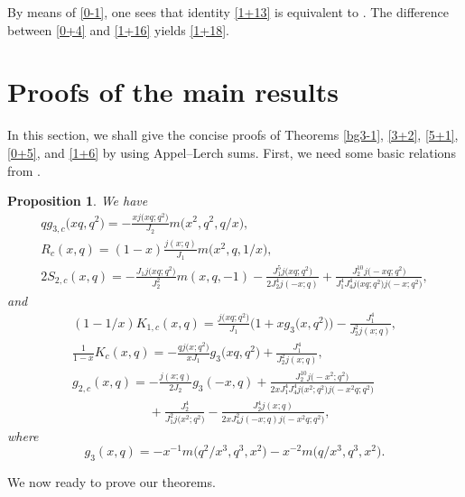 \documentclass[10pt,a4paper]{amsart}
\numberwithin{equation}{section}
\newtheorem{Proposition}[Theorem]{Proposition}
 { \theoremstyle{definition}
\newtheorem{Definition}[Theorem]{Definition}
\newtheorem{Note}[Theorem]{Note}
\newtheorem{Example}[Theorem]{Example}
\newtheorem{Remark}[Theorem]{Remark} }
\begin{document}
\begin{Remark}
By means of \eqref{0-1}, one sees that identity \eqref{1+13} is equivalent to \cite[equation~(16)]{Hi}.
The difference between \eqref{0+4} and \eqref{1+16} yields \eqref{1+18}.
\end{Remark}

\section{Proofs of the main results} \label{sec1}
In this section, we shall give the concise proofs of Theorems \ref{bg3-1}, \ref{3+2}, \ref{5+1}, \ref{0+5}, and \ref{1+6} by using Appel--Lerch sums. First, we need some basic relations from \cite[equations~(4.1), (3.1), (5.12), (5.5), (5.18), (6.10)]{Mo}.
\begin{Proposition} We have
\begin{gather}
\label{2-5}
qg_{3,c}\bigl(xq,q^2\bigr)=-\frac{xj\bigl(xq;q^2\bigr)}{J_2}m\bigl(x^2,q^2,q/x\bigr),\\
R_c(x,q)=(1-x)\frac{j(x;q)}{J_1}m\bigl(x^2,q,1/x\bigr),\label{2.2-add}\\
2S_{2,c}(x,q)=-\frac{J_1j\bigl(xq;q^2\bigr)}{J_2^2}m(x,q,-1)
-\frac{J_1^5j\bigl(xq;q^2\bigr)}{2J_2^4j(-x;q)}+\frac{J_2^{10}j\bigl(-xq;q^2\bigr)}{J_1^4J_4^4j \bigl(xq;q^2\bigr)j\bigl(-x;q^2\bigr)}, \label{3-3}
\end{gather}
and
\begin{gather}\label{2-7}
(1-1/x)K_{1,c}(x,q)=\frac{j\bigl(xq;q^2\bigr)}{J_1}\bigl(1+xg_3\bigl(x,q^2\bigr)\bigr)
-\frac{J_1^4}{J_2^2j(x;q)},\\
\frac{1}{1-x}K_{c}(x,q)=-\frac{qj\bigl(x;q^2\bigr)}{xJ_1}g_3\bigl(xq,q^2\bigr)
+\frac{J_1^4}{J_2^2j(x;q)},\label{2-4}\\
g_{2,c}(x,q)=-\frac{j(x;q)}{2J_2}g_3(-x,q)
+\frac{J_2^{10}j\bigl(-x^2;q^2\bigr)}{2xJ_1^4J_4^4j\bigl(x^2;q^2\bigr)j\bigl(-x^2q;q^2\bigr)}\nonumber\\
\phantom{g_{2,c}(x,q)=}{}+\frac{J_2^4}{J_1^2j\bigl(x^2;q^2\bigr)}
-\frac{J_2^4j(x;q)}{2xJ_4^2j(-x;q)j\bigl(-x^2q;q^2\bigr)},\label{2-8}
\end{gather}
where
 \[g_3(x,q)=-x^{-1}m\bigl(q^2/x^3,q^3,x^2\bigr)-x^{-2}m\bigl(q/x^3,q^3,x^2\bigr).\]
\end{Proposition}

We now ready to prove our theorems.
\end{document}
